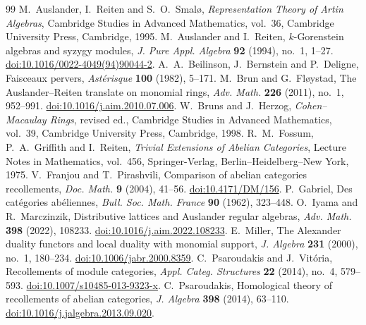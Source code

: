 \documentclass[10pt,a4paper]{amsart}
\begin{document}
\begin{thebibliography}{99}
 M.~Auslander, I.~Reiten and S.~O.~Smal\o, \newblock \emph{Representation Theory of Artin Algebras}, \newblock Cambridge Studies in Advanced Mathematics, vol.~36, Cambridge University Press, Cambridge, 1995.
 M.~Auslander and I.~Reiten, \newblock $k$-Gorenstein algebras and syzygy modules, \newblock \emph{J. Pure Appl. Algebra} \textbf{92} (1994), no.~1, 1--27. \newblock \href{https://doi.org/10.1016/0022-4049(94)90044-2}{doi:10.1016/0022-4049(94)90044-2}.
 A.~A.~Beilinson, J.~Bernstein and P.~Deligne, \newblock Faisceaux pervers, \newblock \emph{Ast\'erisque} \textbf{100} (1982), 5--171.
 M.~Brun and G.~Fl\o ystad, \newblock The Auslander--Reiten translate on monomial rings, \newblock \emph{Adv. Math.} \textbf{226} (2011), no.~1, 952--991. \newblock \href{https://doi.org/10.1016/j.aim.2010.07.006}{doi:10.1016/j.aim.2010.07.006}.
 W.~Bruns and J.~Herzog, \newblock \emph{Cohen--Macaulay Rings}, \newblock revised ed., Cambridge Studies in Advanced Mathematics, vol.~39, Cambridge University Press, Cambridge, 1998.
 R.~M.~Fossum, P.~A.~Griffith and I.~Reiten, \newblock \emph{Trivial Extensions of Abelian Categories}, \newblock Lecture Notes in Mathematics, vol.~456, Springer-Verlag, Berlin--Heidelberg--New York, 1975.
 V.~Franjou and T.~Pirashvili, \newblock Comparison of abelian categories recollements, \newblock \emph{Doc. Math.} \textbf{9} (2004), 41--56. \newblock \href{https://doi.org/10.4171/DM/156}{doi:10.4171/DM/156}.
 P.~Gabriel, \newblock Des cat\'egories ab\'eliennes, \newblock \emph{Bull. Soc. Math. France} \textbf{90} (1962), 323--448.
 O.~Iyama and R.~Marczinzik, \newblock Distributive lattices and Auslander regular algebras, \newblock \emph{Adv. Math.} \textbf{398} (2022), 108233. \newblock \href{https://doi.org/10.1016/j.aim.2022.108233}{doi:10.1016/j.aim.2022.108233}.
 E.~Miller, \newblock The Alexander duality functors and local duality with monomial support, \newblock \emph{J. Algebra} \textbf{231} (2000), no.~1, 180--234. \newblock \href{https://doi.org/10.1006/jabr.2000.8359}{doi:10.1006/jabr.2000.8359}.
 C.~Psaroudakis and J.~Vit\'oria, \newblock Recollements of module categories, \newblock \emph{Appl. Categ. Structures} \textbf{22} (2014), no.~4, 579--593. \newblock \href{https://doi.org/10.1007/s10485-013-9323-x}{doi:10.1007/s10485-013-9323-x}.
 C.~Psaroudakis, \newblock Homological theory of recollements of abelian categories, \newblock \emph{J. Algebra} \textbf{398} (2014), 63--110. \newblock \href{https://doi.org/10.1016/j.jalgebra.2013.09.020}{doi:10.1016/j.jalgebra.2013.09.020}.
\end{thebibliography}
\end{document}
